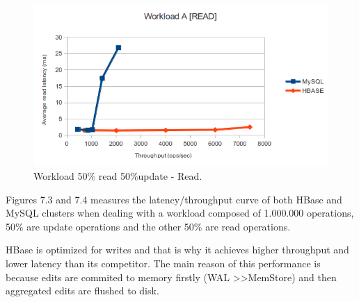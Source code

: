 \begin{figure}[htb]
\centering
\includegraphics[width=1\textwidth]{./images/workloadARead.png}
\caption{Workload 50\% read 50\%update - Read.}
 \label{fig:ARead}
\end{figure}

Figures 7.3 and 7.4 measures the latency/throughput curve of both HBase and MySQL clusters when dealing with a workload composed of 1.000.000 operations, 50\% are update operations and the other 50\% are read operations.
\par
HBase is optimized for writes and that is why it achieves higher throughput and lower latency than its competitor. The main reason of this performance is because edits are commited to memory firstly (WAL \textgreater\textgreater MemStore) and then aggregated edits are flushed to disk.





































